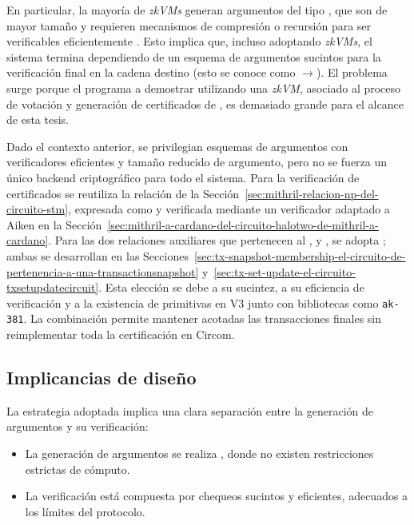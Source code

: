 En particular, la mayoría de \textit{zkVMs} generan argumentos del tipo \STARK, que son de mayor tamaño y requieren mecanismos de compresión o recursión para ser verificables eficientemente \Onchain. Esto implica que, incluso adoptando \textit{zkVMs}, el sistema termina dependiendo de un esquema de argumentos sucintos para la verificación final en la cadena destino (esto se conoce como \STARK$\rightarrow$\SNARK). El problema surge porque el programa a demostrar utilizando una \textit{zkVM}, asociado al proceso de votación y generación de certificados de \Mithril, es demasiado grande para el alcance de esta tesis.

Dado el contexto anterior, se privilegian esquemas de argumentos \ZK con verificadores eficientes y tamaño reducido de argumento, pero no se fuerza un único backend criptográfico para todo el sistema. Para la verificación de certificados \Mithril se reutiliza la relación \STM de la Sección~\ref{sec:mithril-relacion-np-del-circuito-stm}, expresada como \MidnightSTMCircuit y verificada \Onchain mediante un verificador \HaloTwo adaptado a Aiken en la Sección~\ref{sec:mithril-a-cardano-del-circuito-halotwo-de-mithril-a-cardano}. Para las dos relaciones auxiliares que pertenecen al \Bridge, \TxSnapshotMembershipCircuit y \TxSetUpdateCircuit, se adopta \Groth; ambas se desarrollan en las Secciones~\ref{sec:tx-snapshot-membership-el-circuito-de-pertenencia-a-una-transactionsnapshot} y~\ref{sec:tx-set-update-el-circuito-txsetupdatecircuit}. Esta elección se debe a su sucintez, a su eficiencia de verificación y a la existencia de primitivas \BLS en \Plutus V3 junto con bibliotecas como \texttt{ak-381}. La combinación permite mantener acotadas las transacciones finales sin reimplementar toda la certificación \Mithril en Circom.

\subsection{Implicancias de diseño}
\label{subsec:design-decisions-implicancias-de-diseno}

La estrategia adoptada implica una clara separación entre la generación de argumentos y su verificación:

\begin{itemize}[noitemsep]
	\item La generación de argumentos se realiza \Offchain, donde no existen restricciones estrictas de cómputo.
	\item La verificación \Onchain está compuesta por chequeos sucintos y eficientes, adecuados a los límites del protocolo.
\end{itemize}

